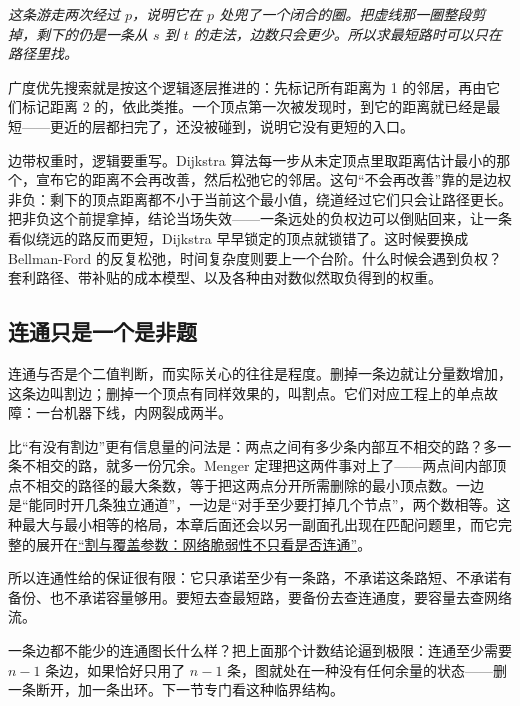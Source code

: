 \begin{center}

\emph{这条游走两次经过 \(p\)，说明它在 \(p\) 处兜了一个闭合的圈。把虚线那一圈整段剪掉，剩下的仍是一条从 \(s\) 到 \(t\) 的走法，边数只会更少。所以求最短路时可以只在路径里找。}
\end{center}

广度优先搜索就是按这个逻辑逐层推进的：先标记所有距离为 1 的邻居，再由它们标记距离 2 的，依此类推。一个顶点第一次被发现时，到它的距离就已经是最短——更近的层都扫完了，还没被碰到，说明它没有更短的入口。

边带权重时，逻辑要重写。Dijkstra 算法每一步从未定顶点里取距离估计最小的那个，宣布它的距离不会再改善，然后松弛它的邻居。这句``不会再改善''靠的是边权非负：剩下的顶点距离都不小于当前这个最小值，绕道经过它们只会让路径更长。把非负这个前提拿掉，结论当场失效——一条远处的负权边可以倒贴回来，让一条看似绕远的路反而更短，Dijkstra 早早锁定的顶点就锁错了。这时候要换成 Bellman-Ford 的反复松弛，时间复杂度则要上一个台阶。什么时候会遇到负权？套利路径、带补贴的成本模型、以及各种由对数似然取负得到的权重。

\subsection{连通只是一个是非题}

连通与否是个二值判断，而实际关心的往往是程度。删掉一条边就让分量数增加，这条边叫割边；删掉一个顶点有同样效果的，叫割点。它们对应工程上的单点故障：一台机器下线，内网裂成两半。

比``有没有割边''更有信息量的问法是：两点之间有多少条内部互不相交的路？多一条不相交的路，就多一份冗余。Menger 定理把这两件事对上了——两点间内部顶点不相交的路径的最大条数，等于把这两点分开所需删除的最小顶点数。一边是``能同时开几条独立通道''，一边是``对手至少要打掉几个节点''，两个数相等。这种最大与最小相等的格局，本章后面还会以另一副面孔出现在匹配问题里，而它完整的展开在\hyperref[sec:04-Discrete-Mathematics/03-Graph-Theory/11]{``割与覆盖参数：网络脆弱性不只看是否连通''}。

所以连通性给的保证很有限：它只承诺至少有一条路，不承诺这条路短、不承诺有备份、也不承诺容量够用。要短去查最短路，要备份去查连通度，要容量去查网络流。

一条边都不能少的连通图长什么样？把上面那个计数结论逼到极限：连通至少需要 \(n-1\) 条边，如果恰好只用了 \(n-1\) 条，图就处在一种没有任何余量的状态——删一条断开，加一条出环。下一节专门看这种临界结构。
